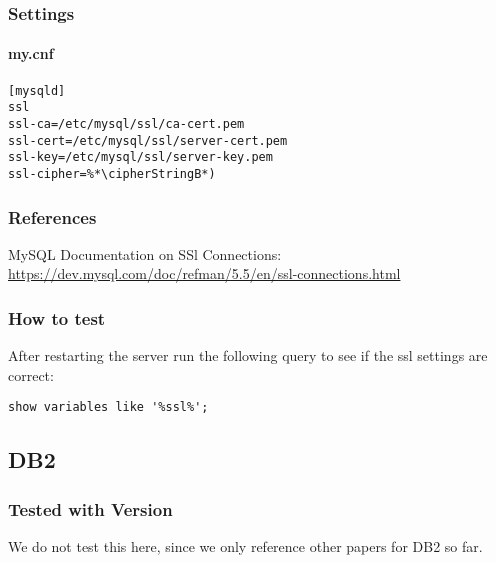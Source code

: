 \subsubsection{Settings}
\paragraph*{my.cnf}
\begin{lstlisting}
[mysqld]
ssl
ssl-ca=/etc/mysql/ssl/ca-cert.pem
ssl-cert=/etc/mysql/ssl/server-cert.pem
ssl-key=/etc/mysql/ssl/server-key.pem
ssl-cipher=%*\cipherStringB*)
\end{lstlisting}






\subsubsection{References}
\begin{itemize*}
  \item MySQL Documentation on SSl Connections: \url{https://dev.mysql.com/doc/refman/5.5/en/ssl-connections.html}
\end{itemize*}


\subsubsection{How to test}
After restarting the server run the following query to see if the ssl settings are correct:
\begin{lstlisting}
show variables like '%ssl%';
\end{lstlisting}


\subsection{DB2}
\subsubsection{Tested with Version}
\begin{itemize*}
\item  We do not test this here, since we only reference other papers for DB2 so far.
\end{itemize*}


